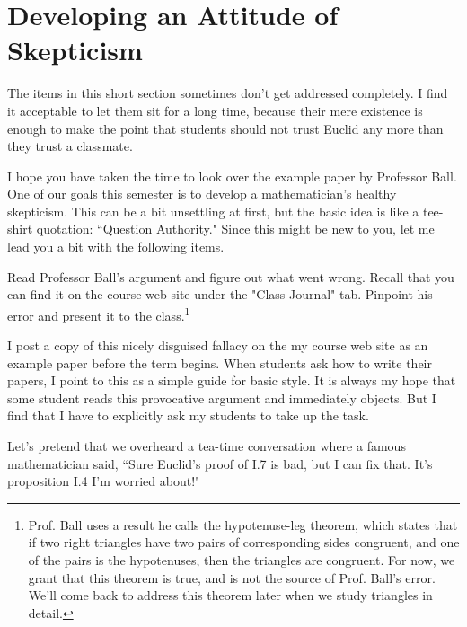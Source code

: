 \chapter{Developing an Attitude of Skepticism}

\begin{annotation}
{
\color{blue}
The items in this short section sometimes don't get addressed completely. I find it acceptable to let them sit for a long time, because their mere existence is enough to make the point 
that students should not trust Euclid any more than they trust a classmate.
}
\end{annotation}

I hope you have taken the time to look over the example paper by Professor Ball.
One of our goals this semester is to develop a mathematician's healthy skepticism.
This can be a bit unsettling at first, but the basic idea is like a tee-shirt quotation: ``Question Authority."
Since this might be new to you, let me lead you a bit with the following items.

\begin{problem}\label{prob:Ball}
Read Professor Ball's argument and figure out what went wrong.
Recall that you can find it on the course web site under the "Class Journal" tab.
Pinpoint his error and present it to the class.\footnote{Prof. Ball uses a result he calls the hypotenuse-leg theorem, which states that if two right triangles have two pairs of corresponding sides congruent, and one of the pairs is the hypotenuses, then the triangles are congruent. For now, we grant that this theorem is true, and is not the source of Prof. Ball's error. We'll come back to address this theorem later when we study triangles in detail.}
\end{problem}

\begin{annotation}
{
\color{blue}
I post a copy of this nicely disguised fallacy on the my course web site as an example paper before the term begins. When students ask how to write their papers, I point to this as a simple guide for basic style. It is always my hope that some student reads this provocative argument and immediately objects. But I find that I have to explicitly ask my students to take up the task.
}
\end{annotation}

Let's pretend that we overheard a tea-time conversation where a famous mathematician said, ``Sure Euclid's proof of I.7 is bad, but I can fix that.
It's proposition I.4 I'm worried about!"

